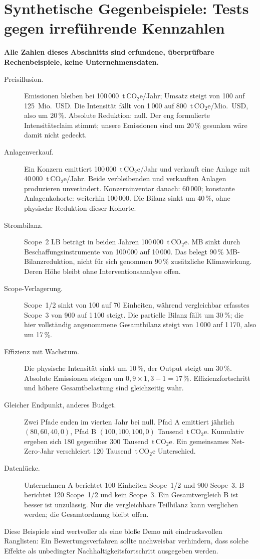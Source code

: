 \documentclass[11pt,a4paper]{article}
\newcommand{\tonnen}{\ensuremath{\mathrm{t\,CO}_{2}\mathrm{e}}}
\begin{document}
\section{Synthetische Gegenbeispiele: Tests gegen irreführende Kennzahlen}
\label{sec:examples}
\textbf{Alle Zahlen dieses Abschnitts sind erfundene, überprüfbare Rechenbeispiele, keine Unternehmensdaten.}
\begin{description}
\item[Preisillusion.] Emissionen bleiben bei 100\,000~\tonnen/Jahr; Umsatz steigt von 100 auf 125~Mio.~USD. Die Intensität fällt von 1\,000 auf 800~\tonnen/Mio.~USD, also um 20\,\%. Absolute Reduktion: null. Der eng formulierte Intensitätsclaim stimmt; \glqq unsere Emissionen sind um 20\,\% gesunken\grqq{} wäre damit nicht gedeckt.
\item[Anlagenverkauf.] Ein Konzern emittiert 100\,000~\tonnen/Jahr und verkauft eine Anlage mit 40\,000~\tonnen/Jahr. Beide verbleibenden und verkauften Anlagen produzieren unverändert. Konzerninventar danach: 60\,000; konstante Anlagenkohorte: weiterhin 100\,000. Die Bilanz sinkt um 40\,\%, ohne physische Reduktion dieser Kohorte.
\item[Strombilanz.] Scope~2 LB beträgt in beiden Jahren 100\,000~\tonnen. MB sinkt durch Beschaffungsinstrumente von 100\,000 auf 10\,000. Das belegt 90\,\% MB-Bilanzreduktion, nicht für sich genommen 90\,\% zusätzliche Klimawirkung. Deren Höhe bleibt ohne Interventionsanalyse offen.
\item[Scope-Verlagerung.] Scope~1/2 sinkt von 100 auf 70 Einheiten, während vergleichbar erfasstes Scope~3 von 900 auf 1\,100 steigt. Die partielle Bilanz fällt um 30\,\%; die hier vollständig angenommene Gesamtbilanz steigt von 1\,000 auf 1\,170, also um 17\,\%.
\item[Effizienz mit Wachstum.] Die physische Intensität sinkt um 10\,\%, der Output steigt um 30\,\%. Absolute Emissionen steigen um $0{,}9\times1{,}3-1=17\,\%$. Effizienzfortschritt und höhere Gesamtbelastung sind gleichzeitig wahr.
\item[Gleicher Endpunkt, anderes Budget.] Zwei Pfade enden im vierten Jahr bei null. Pfad A emittiert jährlich $(80,60,40,0)$, Pfad B $(100,100,100,0)$ Tausend~\tonnen. Kumulativ ergeben sich 180 gegenüber 300 Tausend~\tonnen. Ein gemeinsames Net-Zero-Jahr verschleiert 120 Tausend~\tonnen{} Unterschied.
\item[Datenlücke.] Unternehmen A berichtet 100 Einheiten Scope~1/2 und 900 Scope~3. B berichtet 120 Scope~1/2 und kein Scope~3. Ein Gesamtvergleich \glqq B ist besser\grqq{} ist unzulässig. Nur die vergleichbare Teilbilanz kann verglichen werden; die Gesamtordnung bleibt offen.
\end{description}
Diese Beispiele sind wertvoller als eine bloße Demo mit eindrucksvollen Ranglisten: Ein Bewertungsverfahren sollte nachweisbar verhindern, dass solche Effekte als unbedingter Nachhaltigkeitsfortschritt ausgegeben werden.
\end{document}
